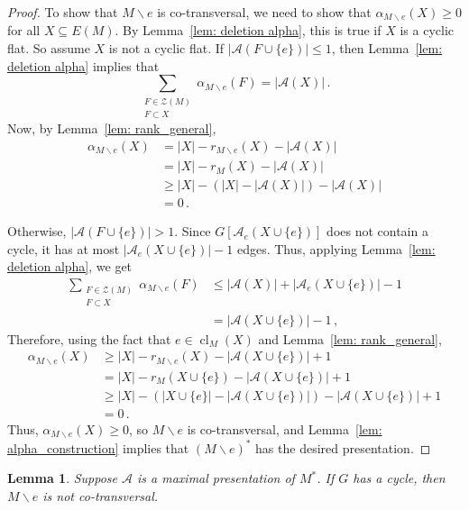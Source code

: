 \documentclass[11pt, reqno]{amsart}
\newtheorem{lemma}[theorem]{Lemma}
\DeclareMathOperator{\cl}{cl}
\begin{document}
\begin{proof}
To show that $M \backslash e$ is co-transversal, we need to show that $\alpha_{M \backslash e}(X) \geq 0$ for all $X \subseteq E(M)$. By Lemma~\ref{lem: deletion alpha}, this is true if $X$ is a cyclic flat. So assume $X$ is not a cyclic flat. If $|\mathcal A(F \cup \{e\})| \leq 1$, then Lemma~\ref{lem: deletion alpha} implies that
$$
\sum_{\substack{F \in \mathcal Z(M) \\ F \subset X}} \alpha_{M \backslash e}(F) = |\mathcal A(X)| \,.
$$
Now, by Lemma~\ref{lem: rank_general},
\begin{align*}
\alpha_{M \backslash e}(X) &= |X| - r_{M \backslash e}(X) - |\mathcal A(X)| \\
&= |X| - r_M(X) - |\mathcal A(X)| \\
&\geq |X| - (|X| - |\mathcal A(X)|) - |\mathcal A(X)| \\
&= 0 \,.
\end{align*}

Otherwise, $|\mathcal A(F \cup \{e\})| > 1$. Since $G[\mathcal A_e(X \cup \{e\})]$ does not contain a cycle, it has at most $|\mathcal A_e(X \cup \{e\})| - 1$ edges. Thus, applying Lemma~\ref{lem: deletion alpha}, we get
\begin{align*}
\sum_{\substack{F \in \mathcal Z(M) \\ F \subset X}} \alpha_{M \backslash e}(F) &\leq |\mathcal A(X)| + |\mathcal A_e(X \cup \{e\})| - 1 \\
&= |\mathcal A(X \cup \{e\})| - 1 \,,
\end{align*}
Therefore, using the fact that $e \in \cl_M(X)$ and Lemma~\ref{lem: rank_general},
\begin{align*}
\alpha_{M \backslash e}(X) &\geq |X| - r_{M \backslash e}(X) - |\mathcal A(X \cup \{e\})| + 1 \\
&=	|X| - r_M(X \cup \{e\}) - |\mathcal A(X \cup \{e\})| + 1 \\
&\geq |X| - (|X \cup \{e\}| - |\mathcal A(X \cup \{e\})|) - |\mathcal A(X \cup \{e\})| + 1 \\
&= 0 \,.
\end{align*}
Thus, $\alpha_{M \backslash e}(X) \geq 0$, so $M \backslash e$ is co-transversal, and Lemma~\ref{lem: alpha_construction} implies that $(M \backslash e)^*$ has the desired presentation.
\end{proof}

\begin{lemma} \label{lem: tree necessary}
Suppose $\mathcal A$ is a maximal presentation of $M^*$. If $G$ has a cycle, then $M \backslash e$ is not co-transversal.
\end{lemma}
\end{document}
